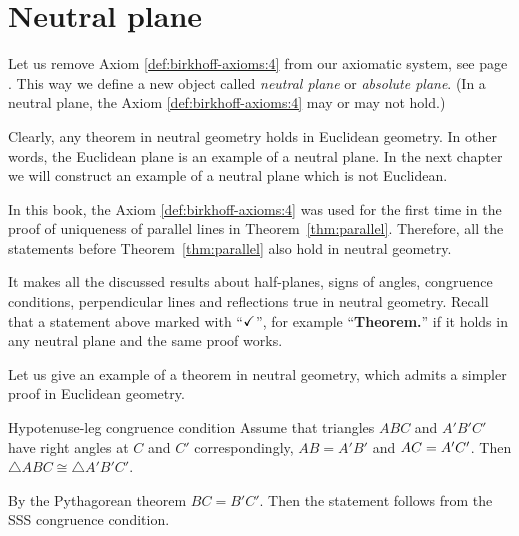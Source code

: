\chapter{Neutral plane}\label{chap:non-euclid}

Let us remove Axiom \ref{def:birkhoff-axioms:4} from our axiomatic system, see page \pageref{def:birkhoff-axioms:0}.
This way we define a new object called 
\emph{neutral plane} or \emph{absolute plane}.
(In a neutral plane, the Axiom \ref{def:birkhoff-axioms:4} may or may not hold.)

Clearly, any theorem in neutral geometry holds in Euclidean geometry.
In other words, the Euclidean plane is an example of a neutral plane. 
In the next chapter we will construct an example of a neutral plane which is not Euclidean.

In this book, 
the Axiom \ref{def:birkhoff-axioms:4} was used
for the first time in the proof of uniqueness of parallel lines in Theorem~\ref{thm:parallel}.
Therefore, all the statements before Theorem~\ref{thm:parallel} also hold in neutral geometry.

It makes all the discussed results
about
half-planes,
signs of angles,
congruence conditions,
perpendicular lines and reflections 
true in neutral geometry.
Recall that a statement above marked with ``$\checkmark$'',\label{a-mark} for example ``\textbf{Theorem.\abs}'' if it holds in any neutral plane and the same proof works.


Let us give an example of a theorem in neutral geometry,
which admits a simpler proof in Euclidean geometry. 

\begin{thm}{Hypotenuse-leg congruence condition}
Assume that triangles $ABC$ and $A'B'C'$
have right angles at $C$ and $C'$ correspondingly, 
$AB=A'B'$ and $AC\z=A'C'$.
Then $\triangle ABC\cong\triangle A'B'C'$.
\end{thm}


By the Pythagorean theorem $BC=B'C'$.
Then the statement follows from the SSS congruence condition.
\qeds

